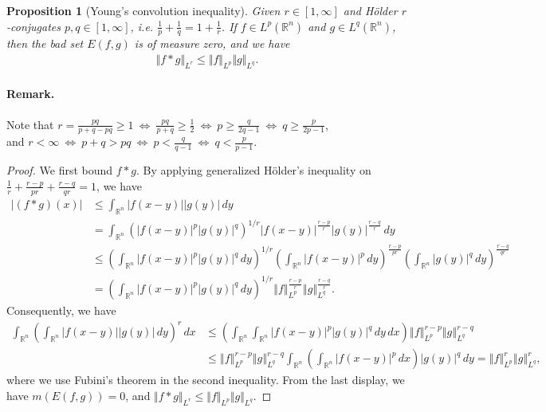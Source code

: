 \documentclass{article}
\numberwithin{equation}{section}
\newcommand{\bbR}{\mathbb{R}}
\theoremstyle{plain}
\newtheorem{proposition}[theorem]{Proposition}
\theoremstyle{definition}
\begin{document}
\begin{proposition}[Young's convolution inequality]\label{prop:1.3}
	Given $r\in[1,\infty]$ and Hölder $r$-conjugates $p,q\in[1,\infty]$, i.e. $\frac{1}{p}+\frac{1}{q}=1+\frac{1}{r}$. If $f\in L^p(\bbR^n)$ and $g\in L^q(\bbR^n)$, then the bad set $E(f,g)$ is of measure zero, and we have
	\begin{align*}
		\Vert f*g\Vert_{L^r}\leq\Vert f\Vert_{L^p}\Vert g\Vert_{L^q}.
	\end{align*}
\end{proposition}
\paragraph{Remark.} Note that $r=\frac{pq}{p+q-pq}\geq 1\ \Leftrightarrow\ \frac{pq}{p+q}\geq\frac{1}{2}\ \Leftrightarrow\  p\geq\frac{q}{2q-1}\ \Leftrightarrow\ q\geq\frac{p}{2p-1}$,\\
and $r<\infty\ \Leftrightarrow\ p+q>pq\ \Leftrightarrow\  p<\frac{q}{q-1}\ \Leftrightarrow\ q<\frac{p}{p-1}$.
\begin{proof}
	We first bound $f*g$. By applying generalized Hölder's inequality on $\frac{1}{r}+\frac{r-p}{pr}+\frac{r-q}{qr}=1$, we have
	\begin{align*}
		\vert (f*g)(x)\vert&\leq\int_{\bbR^n}\left\vert f(x-y)\right\vert\left\vert g(y)\right\vert\,dy\\
		&= \int_{\bbR^n}\left(\vert f(x-y)\vert^p\vert g(y)\vert^q\right)^{1/r}\vert f(x-y)\vert^{\frac{r-p}{r}}\vert g(y)\vert^{\frac{r-q}{r}}\,dy\\
		&\leq\left(\int_{\bbR^n}\vert f(x-y)\vert^p\vert g(y)\vert^q\,dy\right)^{1/r}\left(\int_{\bbR^n}\vert f(x-y)\vert^p\,dy\right)^{\frac{r-p}{pr}}\left(\int_{\bbR^n}\vert g(y)\vert^q\,dy\right)^{\frac{r-q}{qr}}\\
		&=\left(\int_{\bbR^n}\vert f(x-y)\vert^p\vert g(y)\vert^q\,dy\right)^{1/r}\left\Vert f\right\Vert_{L^p}^{\frac{r-p}{r}}\left\Vert g\right\Vert_{L^q}^{\frac{r-q}{r}}.
	\end{align*}
	Consequently, we have
	\begin{align*}
		\int_{\bbR^n}\left(\int_{\bbR^n}\left\vert f(x-y)\right\vert\left\vert g(y)\right\vert\,dy\right)^r\,dx&\leq \left(\int_{\bbR^n}\int_{\bbR^n}\vert f(x-y)\vert^p\vert g(y)\vert^q\,dy\,dx\right)\left\Vert f\right\Vert_{L^p}^{r-p}\left\Vert g\right\Vert_{L^q}^{r-q}\\
		&\leq \left\Vert f\right\Vert_{L^p}^{r-p}\left\Vert g\right\Vert_{L^q}^{r-q}\int_{\bbR^n}\left(\int_{\bbR^n}\vert f(x-y)\vert^p\,dx\right)\vert g(y)\vert^q\,dy=\left\Vert f\right\Vert_{L^p}^r\left\Vert g\right\Vert_{L^q}^r,
	\end{align*}
	where we use Fubini's theorem in the second inequality. From the last display, we have $m(E(f,g))=0$, and $\Vert f*g\Vert_{L^r}\leq\Vert f\Vert_{L^p}\Vert g\Vert_{L^q}$.
\end{proof}
\end{document}
